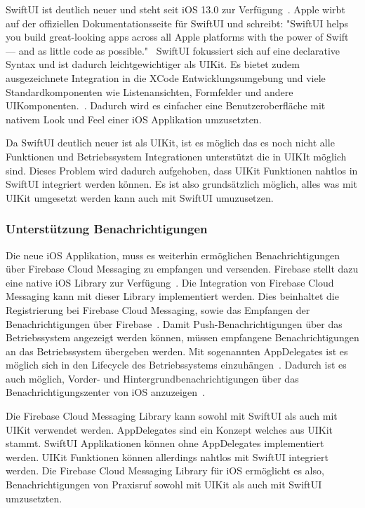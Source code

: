 SwiftUI ist deutlich neuer und steht seit iOS 13.0 zur Verfügung~\cite{ios_swift_ui}.
Apple wirbt auf der offiziellen Dokumentationsseite für SwiftUI und schreibt: "SwiftUI helps you build great-looking apps across all Apple platforms with the power of Swift — and as little code as possible."~\cite{ios_swift_ui}
SwiftUI fokussiert sich auf eine declarative Syntax und ist dadurch leichtgewichtiger als UIKit.
Es bietet zudem ausgezeichnete Integration in die XCode Entwicklungsumgebung und viele Standardkomponenten wie Listenansichten, Formfelder und andere UIKomponenten.~\cite{ios_swift_ui}.
Dadurch wird es einfacher eine Benutzeroberfläche mit nativem Look und Feel einer iOS Applikation umzusetzten.

Da SwiftUI deutlich neuer ist als UIKit, ist es möglich das es noch nicht alle Funktionen und Betriebssystem Integrationen unterstützt die in UIKIt möglich sind.
Dieses Problem wird dadurch aufgehoben, dass UIKit Funktionen nahtlos in SwiftUI integriert werden können.\cite{ios_swift_ui_uikit}
Es ist also grundsätzlich möglich, alles was mit UIKit umgesetzt werden kann auch mit SwiftUI umuzusetzen.

\clearpage

\subsubsection{Unterstützung Benachrichtigungen}

Die neue iOS Applikation, muss es weiterhin ermöglichen Benachrichtigungen über Firebase Cloud Messaging zu empfangen und versenden.
Firebase stellt dazu eine native iOS Library zur Verfügung~\cite{firebase_github_ios}.
Die Integration von Firebase Cloud Messaging kann mit dieser Library implementiert werden.
Dies beinhaltet die Registrierung bei Firebase Cloud Messaging, sowie das Empfangen der Benachrichtigungen über Firebase~\cite{firebase_ios}.
Damit Push-Benachrichtigungen über das Betriebssystem angezeigt werden können, müssen empfangene Benachrichtigungen an das Betriebssystem übergeben werden.
Mit sogenannten AppDelegates ist es möglich sich in den Lifecycle des Betriebssystems einzuhängen~\cite{ios_app_delegate}.
Dadurch ist es auch möglich, Vorder- und Hintergrundbenachrichtigungen über das Benachrichtigungszenter von iOS anzuzeigen~\cite{firebase_ios}.

Die Firebase Cloud Messaging Library kann sowohl mit SwiftUI als auch mit UIKit verwendet werden.
AppDelegates sind ein Konzept welches aus UIKit stammt\cite{ios_app_delegate}.
SwiftUI Applikationen können ohne AppDelegates implementiert werden.
UIKit Funktionen können allerdings nahtlos mit SwiftUI integriert werden.\cite{ios_swift_ui_uikit}
Die Firebase Cloud Messaging Library für iOS ermöglicht es also, Benachrichtigungen von Praxisruf sowohl mit UIKit als auch mit SwiftUI umzusetzten.

